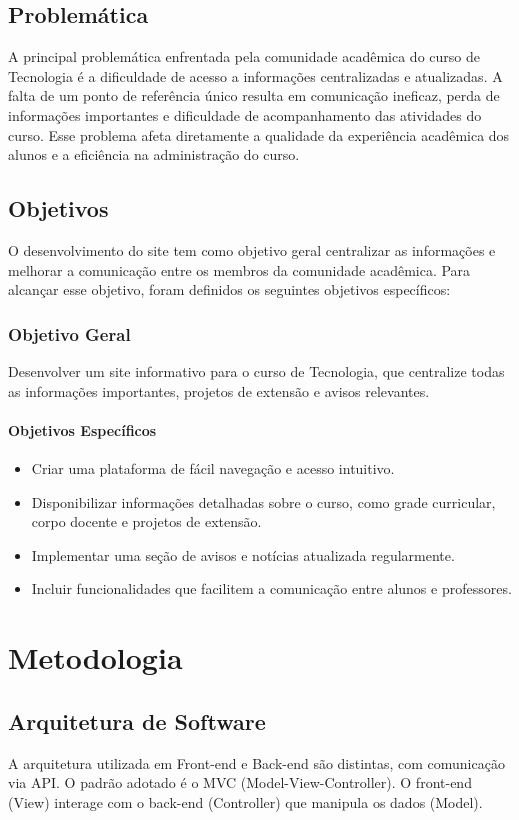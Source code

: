 \documentclass[a4paper,12pt]{report}
\begin{document}
\section{Problemática}
A principal problemática enfrentada pela comunidade acadêmica do curso de Tecnologia é a dificuldade de acesso a informações centralizadas e atualizadas. A falta de um ponto de referência único resulta em comunicação ineficaz, perda de informações importantes e dificuldade de acompanhamento das atividades do curso. Esse problema afeta diretamente a qualidade da experiência acadêmica dos alunos e a eficiência na administração do curso.

\section{Objetivos}
O desenvolvimento do site tem como objetivo geral centralizar as informações e melhorar a comunicação entre os membros da comunidade acadêmica. Para alcançar esse objetivo, foram definidos os seguintes objetivos específicos:

\subsection{Objetivo Geral}
Desenvolver um site informativo para o curso de Tecnologia, que centralize todas as informações importantes, projetos de extensão e avisos relevantes. 

\subsubsection{Objetivos Específicos}
\begin{itemize}
    \item Criar uma plataforma de fácil navegação e acesso intuitivo.
    \item Disponibilizar informações detalhadas sobre o curso, como grade curricular, corpo docente e projetos de extensão.
    \item Implementar uma seção de avisos e notícias atualizada regularmente.
    \item Incluir funcionalidades que facilitem a comunicação entre alunos e professores.
\end{itemize}

\chapter{Metodologia}
\section{Arquitetura de Software} 
A arquitetura utilizada em Front-end e Back-end são distintas, com comunicação via API. O padrão adotado é o MVC (Model-View-Controller). O front-end (View) interage com o back-end (Controller) que manipula os dados (Model). 
\end{document}
